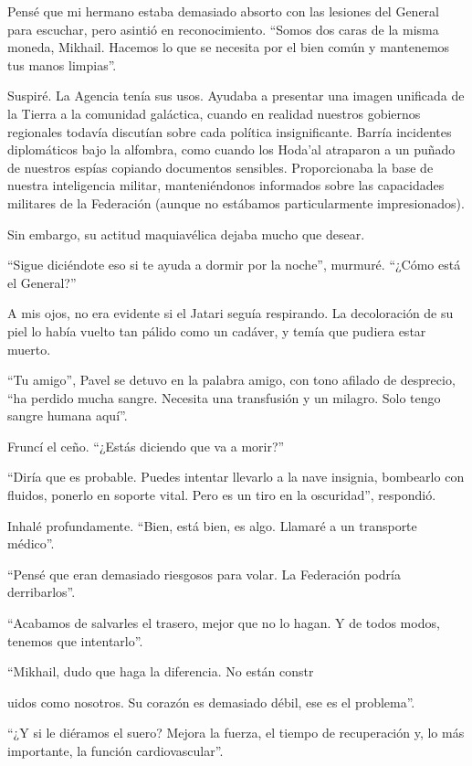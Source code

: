 \documentclass[spanish,12pt,a4paper,oneside,titlepage]{book}
\begin{document}
    Pensé que mi hermano estaba demasiado absorto con las lesiones del General para escuchar, pero asintió en reconocimiento. ``Somos dos caras de la misma moneda, Mikhail. Hacemos lo que se necesita por el bien común y mantenemos tus manos limpias''.

    Suspiré. La Agencia tenía sus usos. Ayudaba a presentar una imagen unificada de la Tierra a la comunidad galáctica, cuando en realidad nuestros gobiernos regionales todavía discutían sobre cada política insignificante. Barría incidentes diplomáticos bajo la alfombra, como cuando los Hoda'al atraparon a un puñado de nuestros espías copiando documentos sensibles. Proporcionaba la base de nuestra inteligencia militar, manteniéndonos informados sobre las capacidades militares de la Federación (aunque no estábamos particularmente impresionados).

    Sin embargo, su actitud maquiavélica dejaba mucho que desear.

    ``Sigue diciéndote eso si te ayuda a dormir por la noche'', murmuré. ``¿Cómo está el General?''

    A mis ojos, no era evidente si el Jatari seguía respirando. La decoloración de su piel lo había vuelto tan pálido como un cadáver, y temía que pudiera estar muerto.

    ``Tu amigo'', Pavel se detuvo en la palabra amigo, con tono afilado de desprecio, ``ha perdido mucha sangre. Necesita una transfusión y un milagro. Solo tengo sangre humana aquí''.

    Fruncí el ceño. ``¿Estás diciendo que va a morir?''

    ``Diría que es probable. Puedes intentar llevarlo a la nave insignia, bombearlo con fluidos, ponerlo en soporte vital. Pero es un tiro en la oscuridad'', respondió.

    Inhalé profundamente. ``Bien, está bien, es algo. Llamaré a un transporte médico''.

    ``Pensé que eran demasiado riesgosos para volar. La Federación podría derribarlos''.

    ``Acabamos de salvarles el trasero, mejor que no lo hagan. Y de todos modos, tenemos que intentarlo''.

    ``Mikhail, dudo que haga la diferencia. No están constr

    uidos como nosotros. Su corazón es demasiado débil, ese es el problema''.

    ``¿Y si le diéramos el suero? Mejora la fuerza, el tiempo de recuperación y, lo más importante, la función cardiovascular''.
\end{document}
